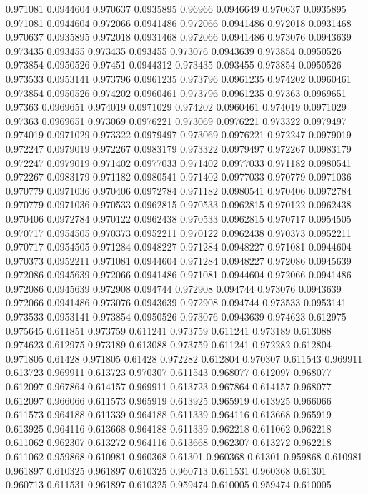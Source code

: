 0.971081 0.0944604
0.970637 0.0935895
0.96966 0.0946649
0.970637 0.0935895
0.971081 0.0944604
0.972066 0.0941486
0.972066 0.0941486
0.972018 0.0931468
0.970637 0.0935895
0.972018 0.0931468
0.972066 0.0941486
0.973076 0.0943639
0.973435 0.093455
0.973435 0.093455
0.973076 0.0943639
0.973854 0.0950526
0.973854 0.0950526
0.97451 0.0944312
0.973435 0.093455
0.973854 0.0950526
0.973533 0.0953141
0.973796 0.0961235
0.973796 0.0961235
0.974202 0.0960461
0.973854 0.0950526
0.974202 0.0960461
0.973796 0.0961235
0.97363 0.0969651
0.97363 0.0969651
0.974019 0.0971029
0.974202 0.0960461
0.974019 0.0971029
0.97363 0.0969651
0.973069 0.0976221
0.973069 0.0976221
0.973322 0.0979497
0.974019 0.0971029
0.973322 0.0979497
0.973069 0.0976221
0.972247 0.0979019
0.972247 0.0979019
0.972267 0.0983179
0.973322 0.0979497
0.972267 0.0983179
0.972247 0.0979019
0.971402 0.0977033
0.971402 0.0977033
0.971182 0.0980541
0.972267 0.0983179
0.971182 0.0980541
0.971402 0.0977033
0.970779 0.0971036
0.970779 0.0971036
0.970406 0.0972784
0.971182 0.0980541
0.970406 0.0972784
0.970779 0.0971036
0.970533 0.0962815
0.970533 0.0962815
0.970122 0.0962438
0.970406 0.0972784
0.970122 0.0962438
0.970533 0.0962815
0.970717 0.0954505
0.970717 0.0954505
0.970373 0.0952211
0.970122 0.0962438
0.970373 0.0952211
0.970717 0.0954505
0.971284 0.0948227
0.971284 0.0948227
0.971081 0.0944604
0.970373 0.0952211
0.971081 0.0944604
0.971284 0.0948227
0.972086 0.0945639
0.972086 0.0945639
0.972066 0.0941486
0.971081 0.0944604
0.972066 0.0941486
0.972086 0.0945639
0.972908 0.094744
0.972908 0.094744
0.973076 0.0943639
0.972066 0.0941486
0.973076 0.0943639
0.972908 0.094744
0.973533 0.0953141
0.973533 0.0953141
0.973854 0.0950526
0.973076 0.0943639
0.974623 0.612975
0.975645 0.611851
0.973759 0.611241
0.973759 0.611241
0.973189 0.613088
0.974623 0.612975
0.973189 0.613088
0.973759 0.611241
0.972282 0.612804
0.971805 0.61428
0.971805 0.61428
0.972282 0.612804
0.970307 0.611543
0.969911 0.613723
0.969911 0.613723
0.970307 0.611543
0.968077 0.612097
0.968077 0.612097
0.967864 0.614157
0.969911 0.613723
0.967864 0.614157
0.968077 0.612097
0.966066 0.611573
0.965919 0.613925
0.965919 0.613925
0.966066 0.611573
0.964188 0.611339
0.964188 0.611339
0.964116 0.613668
0.965919 0.613925
0.964116 0.613668
0.964188 0.611339
0.962218 0.611062
0.962218 0.611062
0.962307 0.613272
0.964116 0.613668
0.962307 0.613272
0.962218 0.611062
0.959868 0.610981
0.960368 0.61301
0.960368 0.61301
0.959868 0.610981
0.961897 0.610325
0.961897 0.610325
0.960713 0.611531
0.960368 0.61301
0.960713 0.611531
0.961897 0.610325
0.959474 0.610005
0.959474 0.610005

